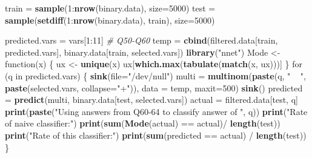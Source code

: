 \documentclass[]{article}
\newenvironment{Shaded}{\begin{snugshade}}{\end{snugshade}}
\newcommand{\KeywordTok}[1]{\textcolor[rgb]{0.13,0.29,0.53}{\textbf{{#1}}}}
\newcommand{\DataTypeTok}[1]{\textcolor[rgb]{0.13,0.29,0.53}{{#1}}}
\newcommand{\DecValTok}[1]{\textcolor[rgb]{0.00,0.00,0.81}{{#1}}}
\newcommand{\StringTok}[1]{\textcolor[rgb]{0.31,0.60,0.02}{{#1}}}
\newcommand{\CommentTok}[1]{\textcolor[rgb]{0.56,0.35,0.01}{\textit{{#1}}}}
\newcommand{\NormalTok}[1]{{#1}}
\begin{document}
\begin{Shaded}
\begin{Highlighting}[]
\NormalTok{train =}\StringTok{ }\KeywordTok{sample}\NormalTok{(}\DecValTok{1}\NormalTok{:}\KeywordTok{nrow}\NormalTok{(binary.data), }\DataTypeTok{size=}\DecValTok{5000}\NormalTok{)}
\NormalTok{test =}\StringTok{ }\KeywordTok{sample}\NormalTok{(}\KeywordTok{setdiff}\NormalTok{(}\DecValTok{1}\NormalTok{:}\KeywordTok{nrow}\NormalTok{(binary.data), train), }\DataTypeTok{size=}\DecValTok{5000}\NormalTok{)}

\NormalTok{predicted.vars =}\StringTok{ }\NormalTok{vars[}\DecValTok{1}\NormalTok{:}\DecValTok{11}\NormalTok{] }\CommentTok{# Q50-Q60}
\NormalTok{temp =}\StringTok{ }\KeywordTok{cbind}\NormalTok{(filtered.data[train, predicted.vars], binary.data[train, selected.vars])}
\KeywordTok{library}\NormalTok{(}\StringTok{"nnet"}\NormalTok{)}
\NormalTok{Mode <-}\StringTok{ }\NormalTok{function(x) \{}
  \NormalTok{ux <-}\StringTok{ }\KeywordTok{unique}\NormalTok{(x)}
  \NormalTok{ux[}\KeywordTok{which.max}\NormalTok{(}\KeywordTok{tabulate}\NormalTok{(}\KeywordTok{match}\NormalTok{(x, ux)))]}
\NormalTok{\}}
\NormalTok{for (q in predicted.vars) \{}
  \KeywordTok{sink}\NormalTok{(}\DataTypeTok{file=}\StringTok{"/dev/null"}\NormalTok{)}
  \NormalTok{multi =}\StringTok{ }\KeywordTok{multinom}\NormalTok{(}\KeywordTok{paste}\NormalTok{(q, }\StringTok{" ~ "}\NormalTok{, }\KeywordTok{paste}\NormalTok{(selected.vars, }\DataTypeTok{collapse=}\StringTok{"+"}\NormalTok{)), }\DataTypeTok{data =} \NormalTok{temp, }\DataTypeTok{maxit=}\DecValTok{500}\NormalTok{)}
  \KeywordTok{sink}\NormalTok{()}
  \NormalTok{predicted =}\StringTok{ }\KeywordTok{predict}\NormalTok{(multi, binary.data[test, selected.vars])}
  \NormalTok{actual =}\StringTok{ }\NormalTok{filtered.data[test, q]}
  \KeywordTok{print}\NormalTok{(}\KeywordTok{paste}\NormalTok{(}\StringTok{"Using answers from Q60-64 to classify answer of "}\NormalTok{, q))}
  \KeywordTok{print}\NormalTok{(}\StringTok{"Rate of naive classifier:"}\NormalTok{)}
  \KeywordTok{print}\NormalTok{(}\KeywordTok{sum}\NormalTok{(}\KeywordTok{Mode}\NormalTok{(actual) ==}\StringTok{ }\NormalTok{actual)/}\StringTok{ }\KeywordTok{length}\NormalTok{(test))}
  \KeywordTok{print}\NormalTok{(}\StringTok{"Rate of this classifier:"}\NormalTok{)}
  \KeywordTok{print}\NormalTok{(}\KeywordTok{sum}\NormalTok{(predicted ==}\StringTok{ }\NormalTok{actual) /}\StringTok{ }\KeywordTok{length}\NormalTok{(test))}
\NormalTok{\}}
\end{Highlighting}
\end{Shaded}
\end{document}
